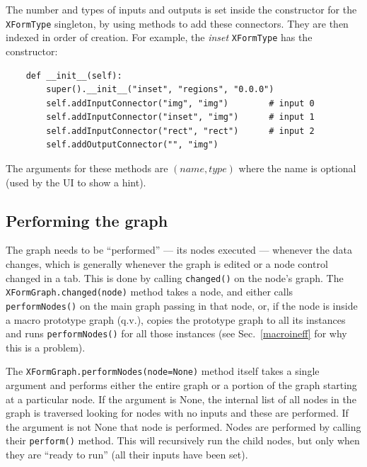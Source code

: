 The number and types of inputs and outputs is set inside the 
constructor for the \texttt{XFormType} singleton, by using methods
to add these connectors. They are then indexed in order of creation.
For example, the \emph{inset} \texttt{XFormType} has the constructor:
\begin{lstlisting}
    def __init__(self):
        super().__init__("inset", "regions", "0.0.0")
        self.addInputConnector("img", "img")        # input 0
        self.addInputConnector("inset", "img")      # input 1
        self.addInputConnector("rect", "rect")      # input 2
        self.addOutputConnector("", "img")
\end{lstlisting}
The arguments for these methods are $(name,type)$ where the name is 
optional (used by the UI to show a hint).

\subsection{Performing the graph}
\label{graphperform}
The graph needs to be ``performed'' --- its nodes executed --- whenever
the data changes, which is generally whenever the graph is edited or
a node control changed in a tab.
This is done by calling \texttt{changed()} on the node's graph.
The \texttt{XFormGraph.changed(node)} method takes a node, and either calls
\texttt{performNodes()} on the main graph passing in that node, or, if the
node is inside a macro prototype graph (q.v.), copies the prototype graph to
all its instances and runs \texttt{performNodes()} for all those instances
(see Sec.~\ref{macroineff} for why this is a problem).

The \texttt{XFormGraph.performNodes(node=None)} method itself takes a single argument and performs
either the entire graph or a portion of the graph starting at a particular node.
If the argument is None, the internal list of all nodes in the graph is traversed looking
for nodes with no inputs and these are performed. If the argument is not None that node
is performed. Nodes are performed by calling their \texttt{perform()} method. This will
recursively run the child nodes, but only when they are ``ready to run''
(all their inputs have been set). 

\clearpage
